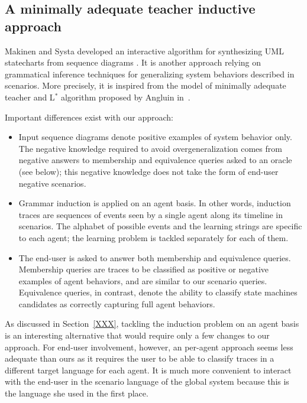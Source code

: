 
\subsection{A minimally adequate teacher inductive approach}

Makinen and Systa developed an interactive algorithm for synthesizing UML statecharts from sequence diagrams \cite{Makinen:2001}. It is another approach relying on grammatical inference techniques for generalizing system behaviors described in scenarios. More precisely, it is inspired from the model of minimally adequate teacher and L$^*$ algorithm proposed by Angluin in~\cite{Angluin:1987}. 

Important differences exist with our approach:
\begin{itemize}

\item Input sequence diagrams denote positive examples of system behavior only. The negative knowledge required to avoid overgeneralization comes from negative answers to membership and equivalence queries asked to an oracle (see below); this negative knowledge does not take the form of end-user negative scenarios.

\item Grammar induction is applied on an agent basis. In other words, induction traces are sequences of events seen by a single agent along its timeline in scenarios. The alphabet of possible events and the learning strings are specific to each agent; the learning problem is tackled separately for each of them.

\item The end-user is asked to answer both membership and equivalence queries. Membership queries are traces to be classified as positive or negative examples of agent behaviors, and are similar to our scenario queries. Equivalence queries, in contrast, denote the ability to classify state machines candidates as correctly capturing full agent behaviors. 
\end{itemize}

As discussed in Section~\ref{XXX}, tackling the induction problem on an agent basis is an interesting alternative that would require only a few changes to our approach. For end-user involvement, however, an per-agent approach seems less adequate than ours as it requires the user to be able to classify traces in a different target language for each agent. It is much more convenient to interact with the end-user in the scenario language of the global system because this is the language she used in the first place.

